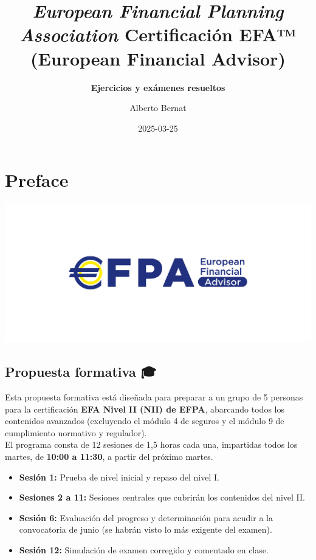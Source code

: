 \documentclass[
  letterpaper,
  DIV=11,
  numbers=noendperiod]{scrreprt}
\title{\emph{European Financial Planning Association} Certificación EFA™
(European Financial Advisor)}
\subtitle{ \textbf{Ejercicios y exámenes resueltos}}
\author{Alberto Bernat}
\date{2025-03-25}
\providecommand{\tightlist}{%
  \setlength{\itemsep}{0pt}\setlength{\parskip}{0pt}}\usepackage{longtable,booktabs,array}
\renewcommand*\contentsname{Table of contents}
\newcommand\contentsname{Table of contents}
\begin{document}
\maketitle

\renewcommand*\contentsname{Table of contents}
{
\hypersetup{linkcolor=}
\setcounter{tocdepth}{2}
\tableofcontents
}


\chapter*{Preface}\label{preface}


\includegraphics{images/EFA_logo.jpg}

\section*{Propuesta formativa 🎓}\label{propuesta-formativa}


Esta propuesta formativa está diseñada para preparar a un grupo de 5
personas para la certificación \textbf{EFA Nivel II (NII) de EFPA},
abarcando todos los contenidos avanzados (excluyendo el módulo 4 de
seguros y el módulo 9 de cumplimiento normativo y regulador).\\
El programa consta de 12 sesiones de 1,5 horas cada una, impartidas
todos los martes, de \textbf{10:00 a 11:30}, a partir del próximo
martes.

\begin{itemize}
\tightlist
\item
  \textbf{Sesión 1:} Prueba de nivel inicial y repaso del nivel I.\\
\item
  \textbf{Sesiones 2 a 11:} Sesiones centrales que cubrirán los
  contenidos del nivel II.\\
\item
  \textbf{Sesión 6:} Evaluación del progreso y determinación para acudir
  a la convocatoria de junio (se habrán visto lo más exigente del
  examen).\\
\item
  \textbf{Sesión 12:} Simulación de examen corregido y comentado en
  clase.
\end{itemize}
\end{document}
